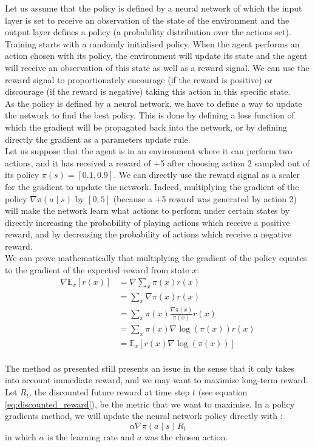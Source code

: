 Let us assume that the
policy is defined by a neural network of which the input layer is set to 
receive an observation of the state of the environment and the output layer
defines a policy (a probability distribution over the actions set).
Training starts with a randomly initialised policy. 
When the agent performs an action chosen with its policy, the environment will
update its state and the agent will receive an observation of this state as
well as a reward signal. We can use the reward signal to proportionately
encourage (if the reward is 
positive) or discourage (if the reward is negative) taking this action in 
this specific state.\\

As the policy is defined by a neural network, we have to define a way to
update the network to find the best policy. This is done by defining a loss
function of which the gradient will be propagated back into the network, or
by defining directly the gradient as a parameters update rule.\\

Let us suppose that the agent is in an environment where it can perform two
actions, and it has received a reward of +5 after choosing action 2
sampled out of its policy $\pi(s) = [0.1, 0.9]$. We can directly use the
reward signal as a scaler for the gradient to update the network. Indeed,
multiplying the gradient of the policy $\nabla \pi(a \mid s)$ by 
$[0, 5]$ (because a +5 reward was generated by action 2) will make the network
learn what actions to perform under certain states by directly increasing the
probability of playing actions which receive a positive reward, and by
decreasing the probability of actions which receive a negative reward.\\

We can prove mathematically that multiplying the gradient of the policy
equates to the gradient of the expected reward from state $x$:
\begin{align*}
	\nabla \mathbb{E}_x[r(x)] &= \nabla \sum\limits_x\pi(x)r(x)\\
	&=  \sum\limits_x \nabla\pi(x)r(x)\\
	&=  \sum\limits_x \pi(x)\frac{\nabla\pi(x)}{\pi(x)}r(x)\\
	&=  \sum\limits_x \pi(x)\nabla\log(\pi(x))r(x)\\
	&=  \mathbb{E}_x[r(x)\nabla\log(\pi(x))]\\
\end{align*}

The method as presented still presents an issue in the sense that it only takes
into account immediate reward, and we may want to maximise long-term reward.
Let $R_t$, the discounted future reward at time step $t$ (see equation 
\ref{eq:discounted_reward}), be the metric
that we want to maximise. In a policy gradients method, we will update the
neural network policy directly with :
\begin{equation}
	\label{eq:policy_update_rule}
	\alpha \nabla \pi(a \mid s) R_t
\end{equation}
in which $\alpha$ is the learning rate and $a$ was the chosen action.

